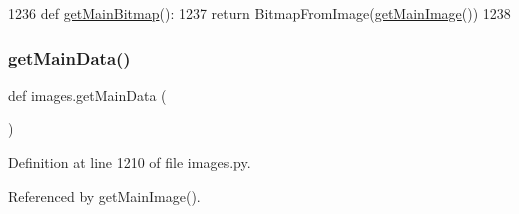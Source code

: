 \begin{DoxyCode}
1236 \textcolor{keyword}{def }\hyperlink{namespaceimages_a13b0b106848f0bb45083014d906d9c93}{getMainBitmap}():
1237     \textcolor{keywordflow}{return} BitmapFromImage(\hyperlink{namespaceimages_a64d996854da6403c27adf405ded8ec7e}{getMainImage}())
1238 
\end{DoxyCode}
\mbox{\label{namespaceimages_a67ab05f76d8ee82ee207e9313f1452b1}} 
\subsubsection{\texorpdfstring{get\+Main\+Data()}{getMainData()}}
{\footnotesize\ttfamily def images.\+get\+Main\+Data (\begin{DoxyParamCaption}{ }\end{DoxyParamCaption})}



Definition at line 1210 of file images.\+py.



Referenced by get\+Main\+Image().


